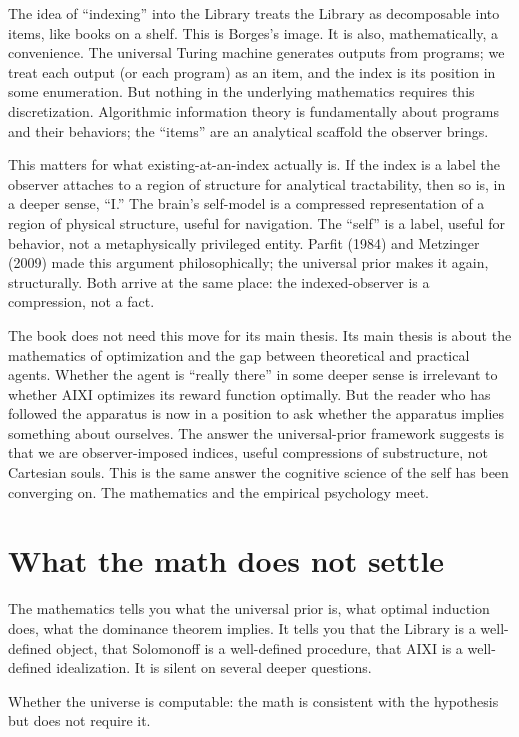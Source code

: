 The idea of ``indexing'' into the Library treats the Library as decomposable into items, like books on a shelf. This is Borges's image. It is also, mathematically, a convenience. The universal Turing machine generates outputs from programs; we treat each output (or each program) as an item, and the index is its position in some enumeration. But nothing in the underlying mathematics requires this discretization. Algorithmic information theory is fundamentally about programs and their behaviors; the ``items'' are an analytical scaffold the observer brings.

This matters for what existing-at-an-index actually is. If the index is a label the observer attaches to a region of structure for analytical tractability, then so is, in a deeper sense, ``I.'' The brain's self-model is a compressed representation of a region of physical structure, useful for navigation. The ``self'' is a label, useful for behavior, not a metaphysically privileged entity. Parfit (1984) and Metzinger (2009) made this argument philosophically; the universal prior makes it again, structurally. Both arrive at the same place: the indexed-observer is a compression, not a fact.

The book does not need this move for its main thesis. Its main thesis is about the mathematics of optimization and the gap between theoretical and practical agents. Whether the agent is ``really there'' in some deeper sense is irrelevant to whether AIXI optimizes its reward function optimally. But the reader who has followed the apparatus is now in a position to ask whether the apparatus implies something about ourselves. The answer the universal-prior framework suggests is that we are observer-imposed indices, useful compressions of substructure, not Cartesian souls. This is the same answer the cognitive science of the self has been converging on. The mathematics and the empirical psychology meet.

\section*{What the math does not settle}

The mathematics tells you what the universal prior is, what optimal induction does, what the dominance theorem implies. It tells you that the Library is a well-defined object, that Solomonoff is a well-defined procedure, that AIXI is a well-defined idealization. It is silent on several deeper questions.

Whether the universe is computable: the math is consistent with the hypothesis but does not require it.

